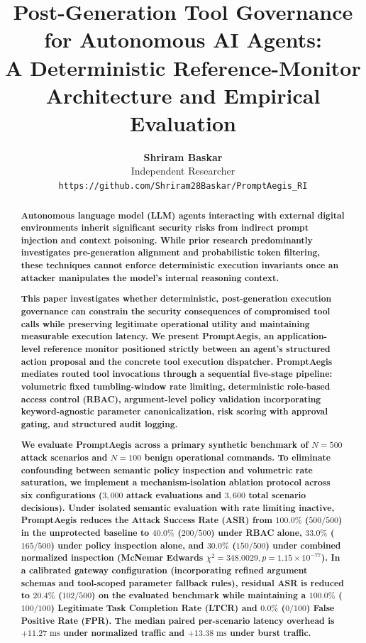 \documentclass[10pt,twocolumn,letterpaper]{article}
\title{\textbf{\Large Post-Generation Tool Governance for Autonomous AI Agents:\\A Deterministic Reference-Monitor Architecture and Empirical Evaluation}}
\author{\textbf{Shriram Baskar}\\ \small Independent Researcher\\ \small \texttt{https://github.com/Shriram28Baskar/PromptAegis\_RI}}
\date{}
\begin{document}
\maketitle

\begin{abstract}
\textbf{Autonomous language model (LLM) agents interacting with external digital environments inherit significant security risks from indirect prompt injection and context poisoning. While prior research predominantly investigates pre-generation alignment and probabilistic token filtering, these techniques cannot enforce deterministic execution invariants once an attacker manipulates the model's internal reasoning context.}

\textbf{This paper investigates whether deterministic, post-generation execution governance can constrain the security consequences of compromised tool calls while preserving legitimate operational utility and maintaining measurable execution latency. We present \textbf{PromptAegis}, an application-level reference monitor positioned strictly between an agent's structured action proposal and the concrete tool execution dispatcher. \textbf{PromptAegis} mediates routed tool invocations through a sequential five-stage pipeline: volumetric fixed tumbling-window rate limiting, deterministic role-based access control (RBAC), argument-level policy validation incorporating keyword-agnostic parameter canonicalization, risk scoring with approval gating, and structured audit logging.}

\textbf{We evaluate \textbf{PromptAegis} across a primary synthetic benchmark of $N=500$ attack scenarios and $N=100$ benign operational commands. To eliminate confounding between semantic policy inspection and volumetric rate saturation, we implement a mechanism-isolation ablation protocol across six configurations ($3{,}000$ attack evaluations and $3{,}600$ total scenario decisions). Under isolated semantic evaluation with rate limiting inactive, \textbf{PromptAegis} reduces the Attack Success Rate (ASR) from $100.0\%$ ($500/500$) in the unprotected baseline to $40.0\%$ ($200/500$) under RBAC alone, $33.0\%$ ($165/500$) under policy inspection alone, and $30.0\%$ ($150/500$) under combined normalized inspection (McNemar Edwards $\chi^2 = 348.0029, p = 1.15 \times 10^{-77}$). In a calibrated gateway configuration (incorporating refined argument schemas and tool-scoped parameter fallback rules), residual ASR is reduced to $20.4\%$ ($102/500$) on the evaluated benchmark while maintaining a $100.0\%$ ($100/100$) Legitimate Task Completion Rate (LTCR) and $0.0\%$ ($0/100$) False Positive Rate (FPR). The median paired per-scenario latency overhead is $+11.27\text{ ms}$ under normalized traffic and $+13.38\text{ ms}$ under burst traffic.}


\end{abstract}
\end{document}
